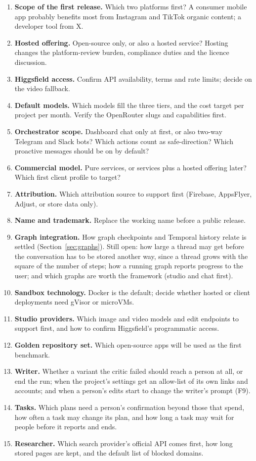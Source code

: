 \documentclass[11pt,a4paper]{article}
\begin{document}
\begin{enumerate}
  \item \textbf{Scope of the first release.} Which two platforms first? A consumer mobile app probably benefits most from Instagram and TikTok organic content; a developer tool from X.
  \item \textbf{Hosted offering.} Open-source only, or also a hosted service? Hosting changes the platform-review burden, compliance duties and the licence discussion.
  \item \textbf{Higgsfield access.} Confirm API availability, terms and rate limits; decide on the video fallback.
  \item \textbf{Default models.} Which models fill the three tiers, and the cost target per project per month. Verify the OpenRouter slugs and capabilities first.
  \item \textbf{Orchestrator scope.} Dashboard chat only at first, or also two-way Telegram and Slack bots? Which actions count as safe-direction? Which proactive messages should be on by default?
  \item \textbf{Commercial model.} Pure services, or services plus a hosted offering later? Which first client profile to target?
  \item \textbf{Attribution.} Which attribution source to support first (Firebase, AppsFlyer, Adjust, or store data only).
  \item \textbf{Name and trademark.} Replace the working name before a public release.
  \item \textbf{Graph integration.} How graph checkpoints and Temporal history relate is settled (Section~\ref{sec:graphs}). Still open: how large a thread may get before the conversation has to be stored another way, since a thread grows with the square of the number of steps; how a running graph reports progress to the user; and which graphs are worth the framework (studio and chat first).
  \item \textbf{Sandbox technology.} Docker is the default; decide whether hosted or client deployments need gVisor or microVMs.
  \item \textbf{Studio providers.} Which image and video models and edit endpoints to support first, and how to confirm Higgsfield's programmatic access.
  \item \textbf{Golden repository set.} Which open-source apps will be used as the first benchmark.
  \item \textbf{Writer.} Whether a variant the critic failed should reach a person at all, or end the run; when the project's settings get an allow-list of its own links and accounts; and when a person's edits start to change the writer's prompt (F9).
  \item \textbf{Tasks.} Which plans need a person's confirmation beyond those that spend, how often a task may change its plan, and how long a task may wait for people before it reports and ends.
  \item \textbf{Researcher.} Which search provider's official API comes first, how long stored pages are kept, and the default list of blocked domains.
\end{enumerate}
\end{document}
